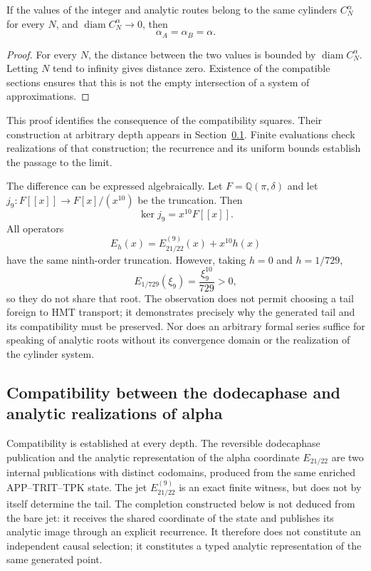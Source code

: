 \begin{proposition}
\label{x_reciprocidad:prop:alpha-dos-limites}
If the values of the integer and analytic routes belong to the
same cylinders \(C_N^\alpha\) for every \(N\), and
\(\operatorname{diam}C_N^\alpha\to0\), then
\[
 \alpha_A=\alpha_B=\alpha.
\]
\end{proposition}

\begin{proof}
For every \(N\), the distance between the two values is bounded
by \(\operatorname{diam}C_N^\alpha\). Letting \(N\) tend to infinity
gives distance zero. Existence of the compatible sections ensures
that this is not the empty intersection of a system of approximations.
\end{proof}

This proof identifies the consequence of the compatibility squares.
Their construction at arbitrary depth appears in
Section~\ref{x_reciprocidad:subsec:alpha-publicaciones-completas}. Finite
evaluations check realizations of that construction; the recurrence
and its uniform bounds establish the passage to the limit.

The difference can be expressed algebraically. Let
\(F=\mathbb Q(\pi,\delta)\) and let
\(j_9:F[[x]]\to F[x]/(x^{10})\) be the truncation. Then
\[
 \ker j_9=x^{10}F[[x]].
\]
All operators
\[
 E_h(x)=E_{21/22}^{(9)}(x)+x^{10}h(x)
\]
have the same ninth-order truncation. However, taking
\(h=0\) and \(h=1/729\),
\[
 E_{1/729}(\xi_9)=\frac{\xi_9^{10}}{729}>0,
\]
so they do not share that root. The observation does not permit choosing a
tail foreign to HMT transport; it demonstrates precisely why the generated
tail and its compatibility must be preserved. Nor does an arbitrary formal
series suffice for speaking of analytic roots without its convergence
domain or the realization of the cylinder system.

\subsection{Compatibility between the dodecaphase and analytic realizations of alpha}
\label{x_reciprocidad:subsec:alpha-publicaciones-completas}

Compatibility is established at every depth. The reversible dodecaphase
publication and the analytic representation of the alpha
coordinate
\(E_{21/22}\) are two internal publications with distinct codomains,
produced from the same enriched APP--TRIT--TPK state. The jet
\(E_{21/22}^{(9)}\) is an exact finite witness, but does not by itself determine
the tail. The completion constructed below is not deduced from the bare
jet: it receives the shared coordinate of the state and publishes its analytic
image through an explicit recurrence. It therefore does not constitute an
independent causal selection; it constitutes a typed analytic representation
of the same generated point.

